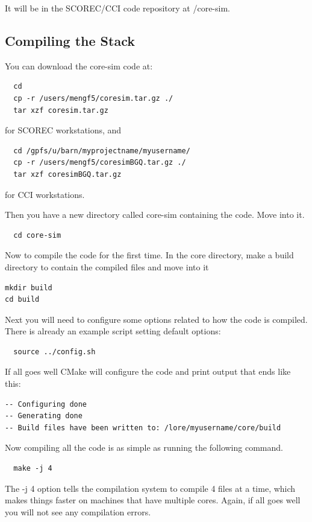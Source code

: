 \documentclass{article}
\begin{document}
It will be in the SCOREC/CCI code repository at /core-sim.

\subsection{Compiling the Stack}

You can download the core-sim code at:

\begin{lstlisting}
  cd
  cp -r /users/mengf5/coresim.tar.gz ./
  tar xzf coresim.tar.gz
\end{lstlisting}
for SCOREC workstations, and 
\begin{lstlisting}
  cd /gpfs/u/barn/myprojectname/myusername/
  cp -r /users/mengf5/coresimBGQ.tar.gz ./
  tar xzf coresimBGQ.tar.gz
\end{lstlisting}
for CCI workstations.

Then you have a new directory called core-sim containing the code. Move into it.
\begin{lstlisting}
  cd core-sim
\end{lstlisting}

Now to compile the code for the first time. In the core directory, make a build directory to contain the compiled files and move into it
\begin{lstlisting} 
mkdir build
cd build
\end{lstlisting}

Next you will need to configure some options related to how the code is compiled. There is already an example script setting default options:
\begin{lstlisting}
  source ../config.sh
\end{lstlisting}

If all goes well CMake will configure the code and print output that ends like this:
\begin{lstlisting}
-- Configuring done
-- Generating done
-- Build files have been written to: /lore/myusername/core/build
\end{lstlisting}

Now compiling all the code is as simple as running the following command.
\begin{lstlisting}
  make -j 4
  \end{lstlisting}

The -j 4 option tells the compilation system to compile 4 files at a time, which makes things faster on machines that have multiple cores.
Again, if all goes well you will not see any compilation errors.
\end{document}
